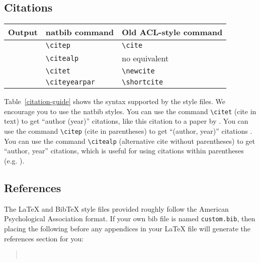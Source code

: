 \documentclass[11pt]{article}
\begin{document}
\subsection{Citations}

\begin{table*}
\centering
\begin{tabular}{lll}
\hline
\textbf{Output} & \textbf{natbib command} & \textbf{Old ACL-style command}\\
\hline
\citep{Gusfield:97} & \verb|\citep| & \verb|\cite| \\
\citealp{Gusfield:97} & \verb|\citealp| & no equivalent \\
\citet{Gusfield:97} & \verb|\citet| & \verb|\newcite| \\
\citeyearpar{Gusfield:97} & \verb|\citeyearpar| & \verb|\shortcite| \\
\hline
\end{tabular}
\caption{\label{citation-guide}
Citation commands supported by the style file.
The style is based on the natbib package and supports all natbib citation commands.
It also supports commands defined in previous ACL style files for compatibility.
}
\end{table*}

Table~\ref{citation-guide} shows the syntax supported by the style files.
We encourage you to use the natbib styles.
You can use the command \verb|\citet| (cite in text) to get ``author (year)'' citations, like this citation to a paper by \citet{Gusfield:97}.
You can use the command \verb|\citep| (cite in parentheses) to get ``(author, year)'' citations \citep{Gusfield:97}.
You can use the command \verb|\citealp| (alternative cite without parentheses) to get ``author, year'' citations, which is useful for using citations within parentheses (e.g. \citealp{Gusfield:97}).

\subsection{References}

\nocite{Ando2005,borschinger-johnson-2011-particle,andrew2007scalable,rasooli-tetrault-2015,goodman-etal-2016-noise,harper-2014-learning}

The \LaTeX{} and Bib\TeX{} style files provided roughly follow the American Psychological Association format.
If your own bib file is named \texttt{custom.bib}, then placing the following before any appendices in your \LaTeX{} file will generate the references section for you:
\begin{quote}
\begin{verbatim}


\end{verbatim}
\end{quote}
\end{document}
